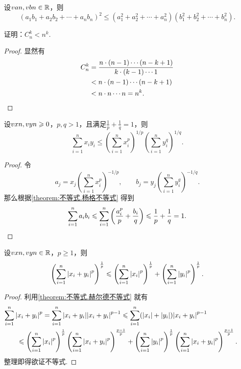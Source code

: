 \begin{theorem}[柯西不等式]\label{theorem:不等式.柯西不等式}
设\(v{a}{n},v{b}{n}\in\mathbb{R}\)，则
\begin{equation}
(a_1 b_1 + a_2 b_2 + \dotsb + a_n b_n)^2
\leqslant
(a_1^2 + a_2^2 + \dotsb + a_n^2) (b_1^2 + b_2^2 + \dotsb + b_n^2).
\end{equation}
\end{theorem}

\begin{example}
证明：\(C_n^k < n^k\).
\begin{proof}
显然有\begin{align*}
C_n^k &= \frac{n \cdot (n-1) \dotsm (n-k+1)}{k \cdot (k-1) \dotsm 1} \\
&< n \cdot (n-1) \dotsm (n-k+1) \\
&< n \cdot n \dotsm n = n^k.
\qedhere
\end{align*}
\end{proof}
\end{example}

\begin{theorem}[赫尔德不等式]\label{theorem:不等式.赫尔德不等式}
设\(v{x}{n},v{y}{n}\geqslant0\)，\(p,q>1\)，且满足\(\frac{1}{p}+\frac{1}{q}=1\)，则
\def\s{\sum\limits_{i=1}^n}%
\def\sp#1#2#3{\left( \s #1^#2 \right)^{#3/#2}}%
\begin{equation}
\s x_i y_i
\leqslant
\sp{x_i}{p}{1} \sp{y_i}{q}{1}.
\end{equation}
\begin{proof}
令\[
a_j = x_j \sp{x_i}{p}{-1}, \qquad
b_j = y_j \sp{y_i}{q}{-1}.
\]那么根据\cref{theorem:不等式.杨格不等式} 得到\[
\s a_i b_i \leqslant \s \left( \frac{a_i^p}{p} + \frac{b_i}{q} \right)
\leqslant \frac{1}{p} + \frac{1}{q} = 1.
\qedhere
\]
\end{proof}
\end{theorem}

\begin{theorem}[闵可夫斯基不等式]\label{theorem:不等式.闵可夫斯基不等式}
设\(v{x}{n},v{y}{n}\in\mathbb{R}\)，\(p\geqslant1\)，则
\def\s{\sum\limits_{i=1}^n}%
\def\sumonly#1{\s \abs{#1}^p}%
\newcommand\sumpower[2][1]{\left( \sumonly{#2} \right)^{\frac{#1}{p}}}%
\begin{equation}
\sumpower{x_i+y_i} \leqslant \sumpower{x_i} + \sumpower{y_i}.
\end{equation}
\begin{proof}
利用\cref{theorem:不等式.赫尔德不等式} 就有\[\begin{aligned}
&\hspace{-20pt}\sumonly{x_i+y_i}
= \s \abs{x_i+y_i} \abs{x_i+y_i}^{p-1}
\leqslant \s (\abs{x_i}+\abs{y_i}) \abs{x_i+y_i}^{p-1} \\
&\leqslant \sumpower{x_i} \sumpower[p-1]{x_i+y_i}
+ \sumpower{y_i} \sumpower[p-1]{x_i+y_i}.
\end{aligned}\]
整理即得欲证不等式.
\end{proof}
\end{theorem}
